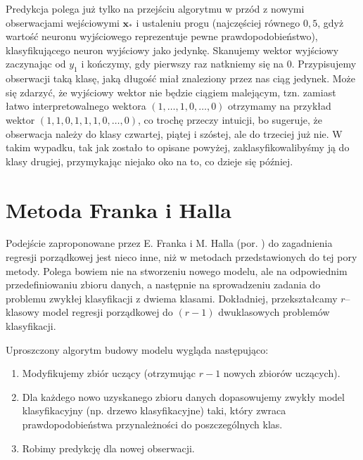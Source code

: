 \documentclass{mini}
\begin{document}
Predykcja polega już tylko na przejściu algorytmu w przód z nowymi obserwacjami wejściowymi $\textbf{x}_{\ast}$ i ustaleniu progu (najczęściej równego $0,5$, gdyż wartość neuronu wyjściowego reprezentuje pewne prawdopodobieństwo), klasyfikującego neuron wyjściowy jako jedynkę. Skanujemy wektor wyjściowy zaczynając od $y_1$ i kończymy, gdy pierwszy raz natkniemy się na $0$. Przypisujemy obserwacji taką klasę, jaką długość miał znaleziony przez nas ciąg jedynek. Może się zdarzyć, że wyjściowy wektor nie będzie ciągiem malejącym, tzn. zamiast łatwo interpretowalnego wektora $(1,\ldots,1,0,\ldots,0)$ otrzymamy na przykład wektor $(1,1,0,1,1,1,0,\ldots,0)$, co trochę przeczy intuicji, bo sugeruje, że obserwacja należy do klasy czwartej, piątej i szóstej, ale do trzeciej już nie. W takim wypadku, tak jak zostało to opisane powyżej, zaklasyfikowalibyśmy ją do klasy drugiej, przymykając niejako oko na to, co dzieje się później.  

\section{Metoda Franka i Halla}

Podejście zaproponowane przez E. Franka i M. Halla (por. \cite{fh}) do zagadnienia regresji porządkowej jest nieco inne, niż w metodach przedstawionych do tej pory metody. Polega bowiem nie na stworzeniu nowego modelu, ale na odpowiednim przedefiniowaniu zbioru danych, a następnie na sprowadzeniu zadania do problemu zwykłej klasyfikacji z dwiema klasami. Dokładniej, przekształcamy $r$--klasowy model regresji porządkowej do $(r-1)$ dwuklasowych problemów klasyfikacji. 

Uproszczony algorytm budowy modelu wygląda następująco:

\begin{enumerate}
\item Modyfikujemy zbiór uczący (otrzymując $r-1$ nowych zbiorów uczących).
\item Dla każdego nowo uzyskanego zbioru danych dopasowujemy zwykły model klasyfikacyjny (np. drzewo klasyfikacyjne) taki, który zwraca prawdopodobieństwa przynależności do poszczególnych klas.
\item Robimy predykcję dla nowej obserwacji. 
\end{enumerate}
\end{document}
